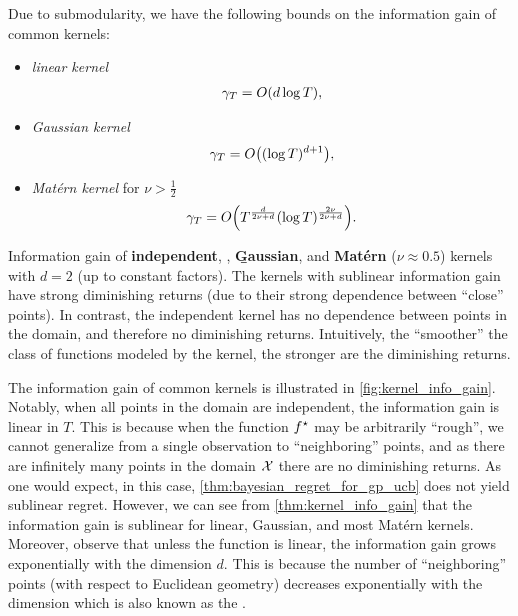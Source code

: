 \begin{thm}\label{thm:kernel_info_gain}
  Due to submodularity, we have the following bounds on the information gain of common kernels: \begin{itemize}
    \item \emph{linear kernel} \begin{align}
      \gamma_T = \BigO{d \log T},
    \end{align}
    \item \emph{Gaussian kernel} \begin{align}
      \gamma_T = \BigO{(\log T)^{d+1}},
    \end{align}
    \item \emph{Matérn kernel} for $\nu > \frac{1}{2}$ \begin{align}
      \gamma_T = \BigO{T^{\frac{d}{2\nu + d}} (\log T)^{\frac{2\nu}{2\nu + d}}}. \label{eq:gamma_t_matern}
    \end{align}
  \end{itemize}
\end{thm}

\begin{marginfigure}
  \caption{Information gain of \textbf{independent}, \textbf{}, \textbf{\b{Gaussian}}, and \r{\textbf{Matérn} ($\nu \approx 0.5$)} kernels with $d = 2$ (up to constant factors).
  The kernels with sublinear information gain have strong diminishing returns (due to their strong dependence between ``close'' points).
  In contrast, the independent kernel has no dependence between points in the domain, and therefore no diminishing returns.
  Intuitively, the ``smoother'' the class of functions modeled by the kernel, the stronger are the diminishing returns.}\label{fig:kernel_info_gain}
\end{marginfigure}

The information gain of common kernels is illustrated in \cref{fig:kernel_info_gain}.
Notably, when all points in the domain are independent, the information gain is linear in $T$.
This is because when the function $f^\star$ may be arbitrarily ``rough'', we cannot generalize from a single observation to ``neighboring'' points, and as there are infinitely many points in the domain $\mathcal{X}$ there are no diminishing returns.
As one would expect, in this case, \cref{thm:bayesian_regret_for_gp_ucb} does not yield sublinear regret.
However, we can see from \cref{thm:kernel_info_gain} that the information gain is sublinear for linear, Gaussian, and most Matérn kernels.
Moreover, observe that unless the function is linear, the information gain grows exponentially with the dimension $d$.
This is because the number of ``neighboring'' points (with respect to Euclidean geometry) decreases exponentially with the dimension which is also known as the .

